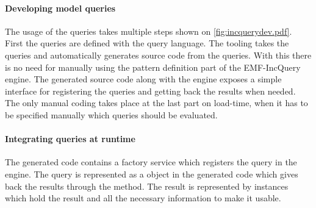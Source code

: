 \paragraph{Developing model queries}
The usage of the queries takes multiple steps shown on \autoref{fig:incquerydev.pdf}.
First the queries are defined with the query language. The tooling takes the queries 
and automatically generates source code from the queries. With this there is no need 
for manually using the pattern definition part of the EMF-IncQuery engine. The generated
source code along with the engine exposes a simple interface for registering the
queries and getting back the results when needed. The only manual coding takes place
at the last part on load-time, when it has to be specified manually which queries 
should be evaluated. 

\paragraph{Integrating queries at runtime}  
The generated code contains a factory service which registers the query in the
engine. The query is represented as a  object in the generated
code which gives back the results through the 
method. The result is represented by  instances which hold the result 
and all the necessary information to make it usable.


